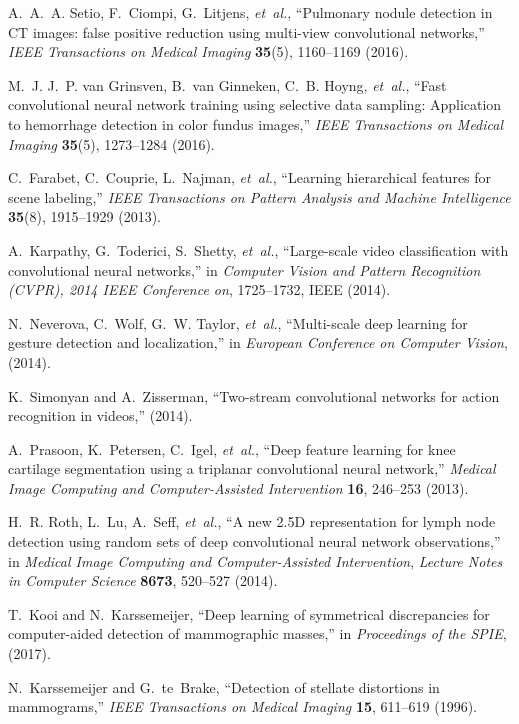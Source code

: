 \documentclass[12pt]{spieman}  %
\begin{document}
\begin{thebibliography}{10}
A.~A.~A. Setio, F.~Ciompi, G.~Litjens, {\em et~al.}, ``Pulmonary nodule
  detection in {CT} images: false positive reduction using multi-view
  convolutional networks,'' {\em IEEE Transactions on Medical Imaging} {\bf
  35}(5), 1160--1169  (2016).

M.~J. J.~P. van Grinsven, B.~van Ginneken, C.~B. Hoyng, {\em et~al.}, ``Fast
  convolutional neural network training using selective data sampling:
  Application to hemorrhage detection in color fundus images,'' {\em IEEE
  Transactions on Medical Imaging} {\bf 35}(5), 1273--1284  (2016).

C.~Farabet, C.~Couprie, L.~Najman, {\em et~al.}, ``Learning hierarchical
  features for scene labeling,'' {\em IEEE Transactions on Pattern Analysis and
  Machine Intelligence} {\bf 35}(8), 1915--1929  (2013).

A.~Karpathy, G.~Toderici, S.~Shetty, {\em et~al.}, ``Large-scale video
  classification with convolutional neural networks,'' in {\em Computer Vision
  and Pattern Recognition (CVPR), 2014 IEEE Conference on},  1725--1732, IEEE
  (2014).

N.~Neverova, C.~Wolf, G.~W. Taylor, {\em et~al.}, ``Multi-scale deep learning
  for gesture detection and localization,'' in {\em European Conference on
  Computer Vision},   (2014).

K.~Simonyan and A.~Zisserman, ``Two-stream convolutional networks for action
  recognition in videos,''  (2014).

A.~Prasoon, K.~Petersen, C.~Igel, {\em et~al.}, ``Deep feature learning for
  knee cartilage segmentation using a triplanar convolutional neural network,''
  {\em Medical Image Computing and Computer-Assisted Intervention} {\bf 16},
  246--253  (2013).

H.~R. Roth, L.~Lu, A.~Seff, {\em et~al.}, ``A new {2.5D} representation for
  lymph node detection using random sets of deep convolutional neural network
  observations,'' in {\em Medical Image Computing and Computer-Assisted
  Intervention},  {\em Lecture Notes in Computer Science} {\bf 8673}, 520--527
  (2014).

T.~Kooi and N.~Karssemeijer, ``Deep learning of symmetrical discrepancies for
  computer-aided detection of mammographic masses,'' in {\em Proceedings of the
  SPIE},   (2017).

N.~Karssemeijer and G.~te~Brake, ``Detection of stellate distortions in
  mammograms,'' {\em IEEE Transactions on Medical Imaging} {\bf 15}, 611--619
  (1996).


\end{thebibliography}
\end{document}
